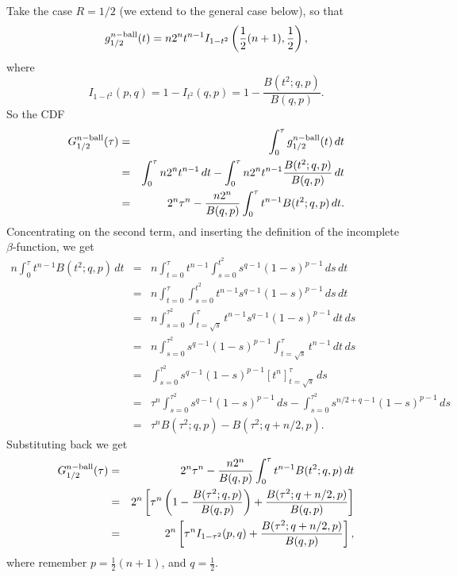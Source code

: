 Take the case $R=1/2$ (we extend to the general case below), so that
\begin{equation}
 g^{n-{\rm ball}}_{1/2}(t) = n 2^n t^{n-1} I_{1-t^2}\left( 
  \frac{1}{2} (n+1), \frac{1}{2}
                      \right),
\end{equation}
where
\begin{equation}
   I_{1-t^2}(p,q) = 1 - I_{t^2}(q,p) = 1 - \frac{ B(t^2; q,p)}{B(q,p)}.
\end{equation}
So the CDF
\begin{eqnarray}
   G^{n-{\rm ball}}_{1/2}(\tau)
       & = & \int_0^\tau g^{n-{\rm ball}}_{1/2}(t) \, dt \nonumber \\
       & = &  \int_0^\tau n 2^n t^{n-1} \, dt 
            - \int_0^\tau n 2^n t^{n-1}  \frac{ B(t^2; q,p)}{B(q,p)} \, dt 
                  \nonumber \\
       & = &  2^n \tau^{n} 
            - \frac{n 2^n}{B(q,p)} \int_0^\tau t^{n-1}   B(t^2; q,p) \, dt .
\end{eqnarray}
Concentrating on the second term, and inserting the definition of the
incomplete $\beta$-function, we get 
\begin{eqnarray}
  n \int_0^\tau t^{n-1}  B(t^2; q,p) \, dt
       & = & n \int_{t=0}^\tau t^{n-1}  \int_{s=0}^{t^2} s^{q-1} (1 - s)^{p-1} \, ds \, dt \nonumber \\
       & = & n \int_{t=0}^\tau \int_{s=0}^{t^2} t^{n-1}  s^{q-1} (1 - s)^{p-1} \, ds \, dt \nonumber \\
       & = & n \int_{s=0}^{\tau^2} \int_{t=\sqrt{s}}^\tau t^{n-1}  s^{q-1} (1 - s)^{p-1} \, dt  \, ds \nonumber \\
       & = & n \int_{s=0}^{\tau^2}  s^{q-1} (1 - s)^{p-1} \int_{t=\sqrt{s}}^\tau t^{n-1} \, dt  \, ds \nonumber \\
       & = & \int_{s=0}^{\tau^2}  s^{q-1} (1 - s)^{p-1} \left[ t^{n} \right]_{t=\sqrt{s}}^\tau  \, ds \nonumber \\
       & = & \tau^n \int_{s=0}^{\tau^2}  s^{q-1} (1 - s)^{p-1} \, ds -
              \int_{s=0}^{\tau^2}  s^{n/2+q-1} (1 - s)^{p-1} \, ds \nonumber \\
       & = & \tau^n B(\tau^2; q,p) -  B(\tau^2; q+n/2,p).
\end{eqnarray}
Substituting back we get
\begin{eqnarray}
   G^{n-{\rm ball}}_{1/2}(\tau)
       & = &  2^n \tau^{n} 
            - \frac{n 2^n}{B(q,p)} \int_0^\tau t^{n-1}   B(t^2; q,p) \, dt  \nonumber \\
       & = &  2^n \left[ \tau^{n} \left(1-   \frac{B(\tau^2; q,p)}{B(q,p)} \right)
                           + \frac{B(\tau^2; q+n/2,p)}{B(q,p)} \right] \nonumber \\
       & = &  2^n \left[ \tau^{n} I_{1-\tau^2}(p,q)  + \frac{B(\tau^2; q+n/2,p)}{B(q,p)} \right],
\end{eqnarray}
where remember $p = \frac{1}{2} (n+1)$, and $q=\frac{1}{2}$.

